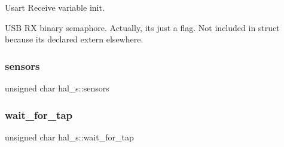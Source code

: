 Usart Receive variable init. 

U\+SB RX binary semaphore. Actually, it\textquotesingle{}s just a flag. Not included in struct because it\textquotesingle{}s declared extern elsewhere. \mbox{\label{group__e_m_p_l_ga6993a0da4e0eb964d49fb309066b1835}} 
\subsubsection{sensors}
{\footnotesize\ttfamily unsigned char hal\+\_\+s\+::sensors}

\mbox{\label{group__e_m_p_l_gac5d6826bbae4a543f9e4bac6e9da755d}} 
\subsubsection{wait\+\_\+for\+\_\+tap}
{\footnotesize\ttfamily unsigned char hal\+\_\+s\+::wait\+\_\+for\+\_\+tap}

